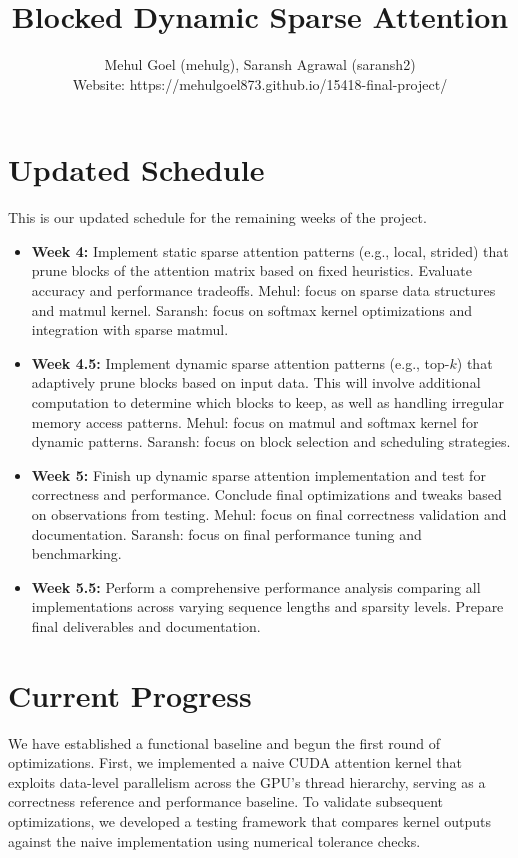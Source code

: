 \documentclass[11pt]{article}
\title{Blocked Dynamic Sparse Attention}
\author{Mehul Goel (mehulg), Saransh Agrawal (saransh2) \\ \small Website: https://mehulgoel873.github.io/15418-final-project/}
\date{}
\begin{document}
\maketitle


\section*{Updated Schedule}
This is our updated schedule for the remaining weeks of the project.
\begin{itemize}
    \item \textbf{Week 4:} Implement static sparse attention patterns (e.g., local, strided) that prune blocks of the attention matrix based on fixed heuristics. Evaluate accuracy and performance tradeoffs. Mehul: focus on sparse data structures and matmul kernel. Saransh: focus on softmax kernel optimizations and integration with sparse matmul.

    \item \textbf{Week 4.5:} Implement dynamic sparse attention patterns (e.g., top-$k$) that adaptively prune blocks based on input data. This will involve additional computation to determine which blocks to keep, as well as handling irregular memory access patterns. Mehul: focus on matmul and softmax kernel for dynamic patterns. Saransh: focus on block selection and scheduling strategies.

    \item \textbf{Week 5:} Finish up dynamic sparse attention implementation and test for correctness and performance. Conclude final optimizations and tweaks based on observations from testing. Mehul: focus on final correctness validation and documentation. Saransh: focus on final performance tuning and benchmarking.
    
    \item \textbf{Week 5.5:} Perform a comprehensive performance analysis comparing all implementations across varying sequence lengths and sparsity levels. Prepare final deliverables and documentation.
\end{itemize}

\section*{Current Progress}

We have established a functional baseline and begun the first round of optimizations. First, we implemented a naive CUDA attention kernel that exploits data-level parallelism across the GPU's thread hierarchy, serving as a correctness reference and performance baseline. To validate subsequent optimizations, we developed a testing framework that compares kernel outputs against the naive implementation using numerical tolerance checks.
\end{document}
